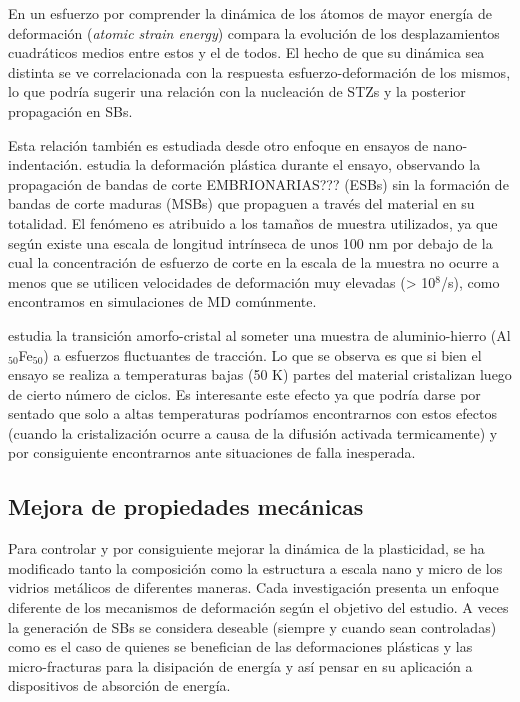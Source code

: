 En un esfuerzo por comprender la dinámica de los átomos de mayor energía de deformación (\textit{atomic strain energy}) \cite{tang15} compara la evolución de los desplazamientos cuadráticos medios entre estos y el de todos. El hecho de que su dinámica sea distinta se ve correlacionada con la respuesta esfuerzo-deformación de los mismos, lo que podría sugerir una relación con la nucleación de STZs y la posterior propagación en SBs.

Esta relación también es estudiada desde otro enfoque en ensayos de nano-indentación. \cite{gu15} estudia la deformación plástica durante el ensayo, observando la propagación de bandas de corte EMBRIONARIAS??? (ESBs) sin la formación de bandas de corte maduras (MSBs) que propaguen a través del material en su totalidad. El fenómeno es atribuido a los tamaños de muestra utilizados, ya que según \cite{shimizu06} existe una escala de longitud intrínseca de unos 100 nm por debajo de la cual la concentración de esfuerzo de corte en la escala de la muestra no ocurre a menos que se utilicen velocidades de deformación muy elevadas (> 10$^{8}$/s), como encontramos en simulaciones de MD comúnmente.

\cite{ma15} estudia la transición amorfo-cristal al someter una muestra de aluminio-hierro (Al$_{50}$Fe$_{50}$) a esfuerzos fluctuantes de tracción. Lo que se observa es que si bien el ensayo se realiza a temperaturas bajas (50 K) partes del material cristalizan luego de cierto número de ciclos. Es interesante este efecto ya que podría darse por sentado que solo a altas temperaturas podríamos encontrarnos con estos efectos (cuando la cristalización ocurre a causa de la difusión activada termicamente) y por consiguiente encontrarnos ante situaciones de falla inesperada.

\subsection{Mejora de propiedades mecánicas}
\label{S1_3_3}

Para controlar y por consiguiente mejorar la dinámica de la plasticidad, se ha modificado tanto la composición como la estructura a escala nano y micro de los vidrios metálicos de diferentes maneras. Cada investigación presenta un enfoque diferente de los mecanismos de deformación según el objetivo del estudio. A veces la generación de SBs se considera deseable (siempre y cuando sean controladas) como es el caso de \cite{chen14} quienes se benefician de las deformaciones plásticas y las micro-fracturas para la disipación de energía y así pensar en su aplicación a dispositivos de absorción de energía.

